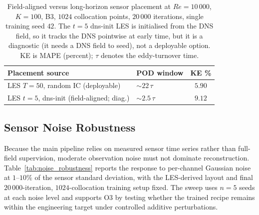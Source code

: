 \begin{table}[!htbp]
    \centering
    \caption{Field-aligned versus long-horizon sensor placement at $Re=10\,000$, $K=100$, B3, $1024$ collocation points, $20\,000$ iterations, single training seed $42$. The $t=5$ dns-init LES is initialised from the DNS field, so it tracks the DNS pointwise at early time, but it is a diagnostic (it needs a DNS field to seed), not a deployable option. KE is MAPE (percent); $\tau$ denotes the eddy-turnover time.}
    \label{tab:placement_dnsinit}
    \small
    \begin{tabular}{llc}
    \toprule
    \textbf{Placement source} & \textbf{POD window} & \textbf{KE \%} \\
    \midrule
    LES $T=50$, random IC (deployable)         & $\sim 22\,\tau$  & $5.90$ \\
    LES $t=5$, dns-init (field-aligned; diag.) & $\sim 2.5\,\tau$ & $9.12$ \\
    \bottomrule
    \end{tabular}
\end{table}

\subsection{Sensor Noise Robustness}
\label{sec:noise_robustness}

Because the main pipeline relies on measured sensor time series rather than full-field supervision, moderate observation noise must not dominate reconstruction. Table~\ref{tab:noise_robustness} reports the response to per-channel Gaussian noise at $1$--$10\%$ of the sensor standard deviation, with the LES-derived layout and final $20\,000$-iteration, $1024$-collocation training setup fixed. The sweep uses $n=5$ seeds at each noise level and supports O3 by testing whether the trained recipe remains within the engineering target under controlled additive perturbations.

